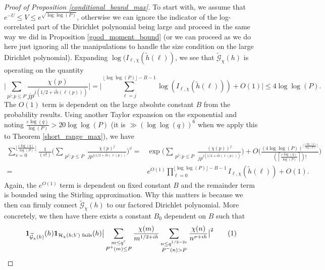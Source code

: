 \documentclass[reqno]{amsart}
\theoremstyle{definition}
\theoremstyle{remark}
\numberwithin{equation}{section}
\newcommand\numberthis{\addtocounter{equation}{1}\tag{\theequation}}
\theoremstyle{remark}
\begin{document}
\begin{proof}[Proof of Proposition \ref{conditional_bound_max}]
    To start with, we assume that $e^{-U} \leq V \leq e^{\sqrt{\log\log(P)}}$, otherwise we can ignore the indicator of the log-correlated part of the Dirichlet polynomial being large and proceed in the same way we did in Proposition \ref{good_moment_bound} (or we can proceed as we do here just ignoring all the manipulations to handle the size condition on the large Dirichlet polynomial). Expanding $\log(I_{\ell,\chi}(\tilde{h}(\ell))$, we see that $\widetilde{\mathcal{G}}_\chi(h)$ is operating on the quantity
    $$\big|\sum_{p^j:p \leq P}\frac{\chi(p)}{jp^{j(1/2+i\tilde{h}(\ell(p)))}}\big|=\big|\sum_{\ell =j}^{\lfloor\log\log(P)\rfloor-B-1}\log(I_{\ell,\chi}(\tilde{h}(\ell))) +O(1)\big| \leq 4\log\log(P).$$
    The $O(1)$ term is dependent on the large absolute constant $B$ from the probability results. Using another Taylor expansion on the exponential and noting $\frac{\varepsilon\log(q)}{\log(P)} > 20\log\log(P)$ (it is $\gg (\log\log(q))^6$ when we apply this to Theorem \ref{short_range_max}), we have
\begin{align*}
    \sum_{v=0}^{\lfloor\frac{\varepsilon\log(q)}{\log(P)}\rfloor}\frac{1}{(v!)}\big(\sum_{\substack{p^j:p \leq P}}\frac{\chi(p)^j}{jp^{j(1/2+i\tilde{h}(\ell(p))}}\big)^v =& \exp\big(\sum_{\substack{p^j:p \leq P}}\frac{(\chi(p))^j}{jp^{j(1/2+i\tilde{h}(\ell(p)))}}\big) + O\big(\frac{(4\log\log(P))^{\lceil\frac{\varepsilon\log(q)}{\log(P)}\rceil}}{(\left\lceil\frac{\varepsilon\log(q)}{\log(P)}\right\rceil)!}\big) \\
    =&e^{O(1)}\prod_{\ell=0}^{\lfloor\log\log(P)\rfloor-B-1}I_{\ell,\chi}(\tilde{h}(\ell)) + O(1).
\end{align*}
Again, the $e^{O(1)}$ term is dependent on fixed constant $B$ and the remainder term is bounded using the Stirling approximation. Why this matters is because we then can firmly connect $\widetilde{\mathcal{G}}_\chi(h)$ to our factored Dirichlet polynomial. More concretely, we then have there exists a constant $B_0$ dependent on $B$ such that
\begin{align*}
    &\mathbf{1}_{\widetilde{\mathcal{G}}_\chi(h)}(h)\mathbf{1}_{\mathcal{H}_\chi(h;V) \text{ fails}}(h)\big|\sum_{\substack{m \leq q^\varepsilon \\ P^+(m) \leq P}}\frac{\chi(m)}{m^{1/2+ih}}\sum_{\substack{n \leq q^{1/2-2\varepsilon} \\ P^-(n) > P}}\frac{\chi(n)}{n^{\sigma+ih}}\big|^2 \numberthis \label{event_translate}\\

\end{align*}
\end{proof}
\end{document}
